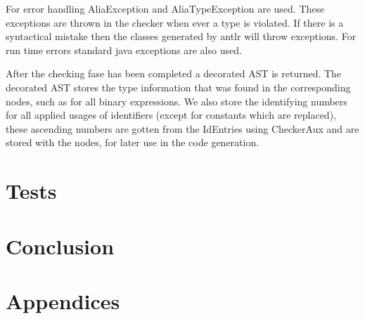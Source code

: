 \documentclass[paper=a4, fontsize=11pt]{report}
\numberwithin{equation}{section}		%
\numberwithin{figure}{section}			%
\numberwithin{table}{section}				%
\begin{document}
For error handling AliaException and AliaTypeException are used. These exceptions are thrown in the checker when ever a type is violated. If there is a syntactical mistake then the classes generated by antlr will throw exceptions. For run time errors standard java exceptions are also used.

After the checking fase has been completed a decorated AST is returned. The decorated AST stores the type information that was found in the corresponding nodes, such as for all binary expressions. We also store the identifying numbers for all applied usages of identifiers (except for constants which are replaced), these ascending numbers are gotten from the IdEntries using CheckerAux and are stored with the nodes, for later use in the code generation.
\chapter{Tests}

\chapter{Conclusion}
\chapter{Appendices}
% 
\end{document}
